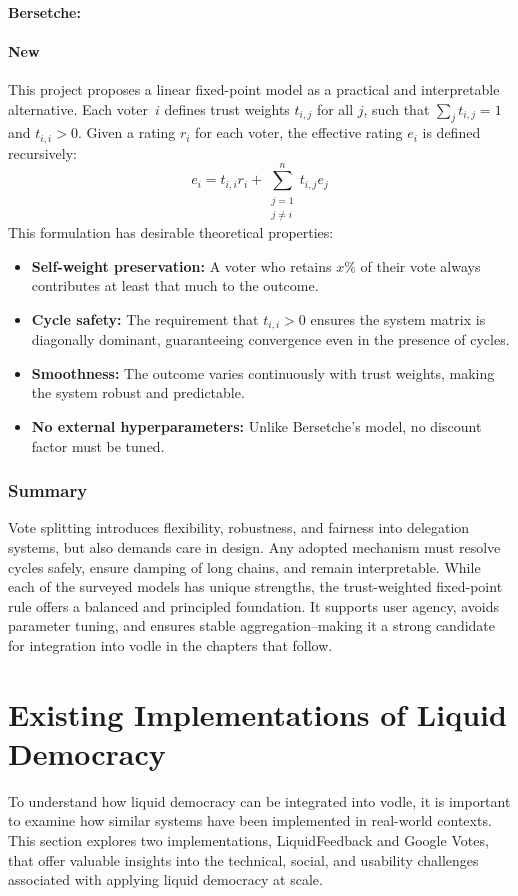 \paragraph{Bersetche: }

\paragraph{New}
This project proposes a linear fixed-point model as a practical and interpretable alternative. Each voter~$i$ defines trust weights $t_{i,j}$ for all $j$, such that $\sum_j t_{i,j} = 1$ and $t_{i,i} > 0$. Given a rating $r_i$ for each voter, the effective rating $e_i$ is defined recursively:
\begin{equation}
    e_i = t_{i,i} r_i + \sum_{\substack{j=1 \\ j \ne i}}^n t_{i,j} e_j
\end{equation}  
This formulation has desirable theoretical properties:
\begin{itemize}
  \item \textbf{Self-weight preservation:} A voter who retains $x\%$ of their vote always contributes at least that much to the outcome.
  \item \textbf{Cycle safety:} The requirement that $t_{i,i} > 0$ ensures the system matrix is diagonally dominant, guaranteeing convergence even in the presence of cycles.
  \item \textbf{Smoothness:} The outcome varies continuously with trust weights, making the system robust and predictable.
  \item \textbf{No external hyperparameters:} Unlike Bersetche's model, no discount factor must be tuned.
\end{itemize}

\subsubsection*{Summary}
Vote splitting introduces flexibility, robustness, and fairness into delegation systems, but also demands care in design. Any adopted mechanism must resolve cycles safely, ensure damping of long chains, and remain interpretable. While each of the surveyed models has unique strengths, the trust-weighted fixed-point rule offers a balanced and principled foundation. It supports user agency, avoids parameter tuning, and ensures stable aggregation--making it a strong candidate for integration into vodle in the chapters that follow.


\section{Existing Implementations of Liquid Democracy}
To understand how liquid democracy can be integrated into vodle, it is important to examine how similar systems have been implemented in real-world contexts. 
This section explores two implementations, LiquidFeedback and Google Votes, that offer valuable insights into the technical, social, and usability challenges associated with applying liquid democracy at scale.
